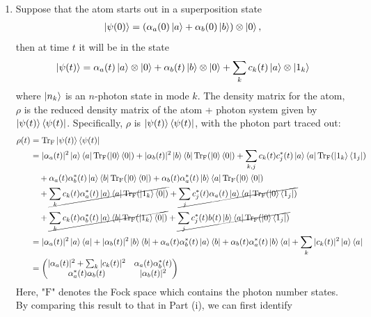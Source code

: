 \documentclass{article}
\theoremstyle{definition}
\newcommand{\al}{\alpha}
\begin{document}
\begin{enumerate}[label=(\alph*)]
\begin{enumerate}[label=(\roman*)]
		\item Suppose that the atom starts out in a superposition state
		\begin{align*}
		\ket{\psi(0)} = (\al_a (0) \ket{a } + \al_b (0) \ket{b})
		\otimes \ket{0},
		\end{align*}
		then at time $t$ it will be in the state
		\begin{align*}
		\ket{\psi(t)} =  \al_a(t) \ket{a} \otimes \ket{0} + \al_b(t) \ket{b} \otimes \ket{0} + \sum_k c_k(t) \ket{a} \otimes \ket{1_k}
		\end{align*}
		where $\ket{n_k}$ is an $n$-photon state in mode $k$. The density matrix for the atom, $\rho$ is the reduced density matrix of the atom + photon system given by $\ket{\psi(t)} \bra{\psi(t)}$. Specifically, $\rho$ is $\ket{\psi(t)} \bra{\psi(t)}$, with the photon part traced out:
		\begin{align*}
		\rho(t) &= \Tr_\text{F}\ket{\psi(t)} \bra{\psi(t)} \\
		&= 
		|\al_a(t)|^2 \ket{a}\bra{a}  \Tr_\text{F}(\ket{0}\bra{0})
		+ 
		|\al_b(t)|^2 \ket{b}\bra{b}  \Tr_\text{F}(\ket{0}\bra{0}) 
		+ 
		\sum_{k,j} c_k(t)c_j^*(t) \ket{a}\bra{a}  \Tr_\text{F}(\ket{1_k}\langle{1_j}|)\\
		&\quad +
		\al_a(t)\al_b^*(t) \ket{a}\bra{b}  \Tr_\text{F}(\ket{0}\bra{0}) 
		+ 
		\al_b(t)\al_a^*(t) \ket{b}\bra{a}  \Tr_\text{F}(\ket{0}\bra{0}) \\
		&\quad + 
		\cancel{\sum_k c_k(t) \al_a^*(t) \ket{a}\bra{a}  \Tr_\text{F}(\ket{1_k}\bra{0})} + 
		\cancel{\sum_j c_j^*(t)\al_a(t) \ket{a}\bra{a}  \Tr_\text{F}(\ket{0}\bra{1_j}) }\\
		&\quad + 
		\cancel{\sum_k c_k(t)\al_b^*(t) \ket{a}\bra{b}  \Tr_\text{F}(\ket{1_k}\bra{0})} + 
		\cancel{\sum_j c_j^*(t) b(t) \ket{b} \bra{a}  \Tr_\text{F}(\ket{0}\bra{1_j})}\\
		&= |\al_a(t)|^2 \ket{a}\bra{a} + |\al_b(t)|^2 \ket{b}\bra{b} + \al_a(t)\al_b^*(t) \ket{a}\bra{b} 
		+ 	\al_b(t)\al_a^*(t) \ket{b}\bra{a} + \sum_k |c_k(t)|^2 \ket{a}\bra{a}\\
		&= \begin{pmatrix}
		|\al_a(t)|^2+ \sum_k |c_k(t)|^2 & \al_a(t)\al_b^*(t) \\ 
		\al_a^*(t)\al_b(t)  & |\al_b(t)|^2  
		\end{pmatrix}
		\end{align*}
		Here, "$\text{F}$" denotes the Fock space which contains the photon number states. By comparing this result to that in Part (i), we can first identify 
		\begin{align*}

\end{align*}
\end{enumerate}
\end{enumerate}
\end{document}
